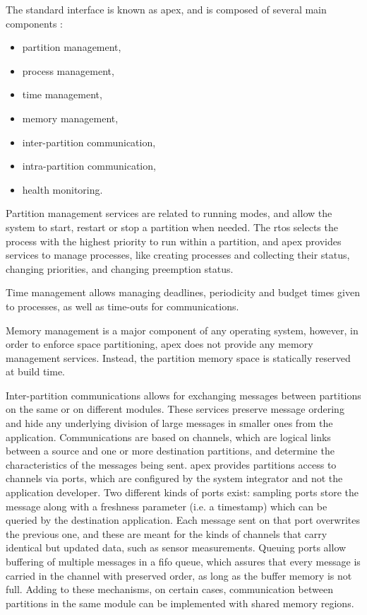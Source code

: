 \documentclass[main.tex]{subfiles}
\begin{document}
The standard interface is known as \gls{apex}, and is composed of several main components \cite{samolej2011arinc,arinc653}:
\begin{itemize}
	\item partition management,
	\item process management,
	\item time management,
	\item memory management,
	\item inter-partition communication,
	\item intra-partition communication,
	\item health monitoring.
\end{itemize}
Partition management services are related to running modes, and allow the system to start, restart or stop a partition when needed.
The \gls{rtos} selects the process with the highest priority to run within a partition, and \gls{apex} provides services to manage processes, like creating processes and collecting their status, changing priorities, and changing preemption status.

Time management allows managing deadlines, periodicity and budget times given to processes, as well as time-outs for communications.

Memory management is a major component of any operating system, however, in order to enforce space partitioning, \gls{apex} does not provide any memory management services.
Instead, the partition memory space is statically reserved at build time.

Inter-partition communications allows for exchanging messages between partitions on the same or on different modules. 
These services preserve message ordering and hide any underlying division of large messages in smaller ones from the application.
Communications are based on channels, which are logical links between a source and one or more destination partitions, and determine the characteristics of the messages being sent.
\gls{apex} provides partitions access to channels via ports, which are configured by the system integrator and not the application developer.
Two different kinds of ports exist: sampling ports store the message along with a freshness parameter (i.e. a timestamp) which can be queried by the destination application. 
Each message sent on that port overwrites the previous one, and these are meant for the kinds of channels that carry identical but updated data, such as sensor measurements.
Queuing ports allow buffering of multiple messages in a \gls{fifo} queue, which assures that every message is carried in the channel with preserved order, as long as the buffer memory is not full.
Adding to these mechanisms, on certain cases, communication between partitions in the same module can be implemented with shared memory regions.
\end{document}
